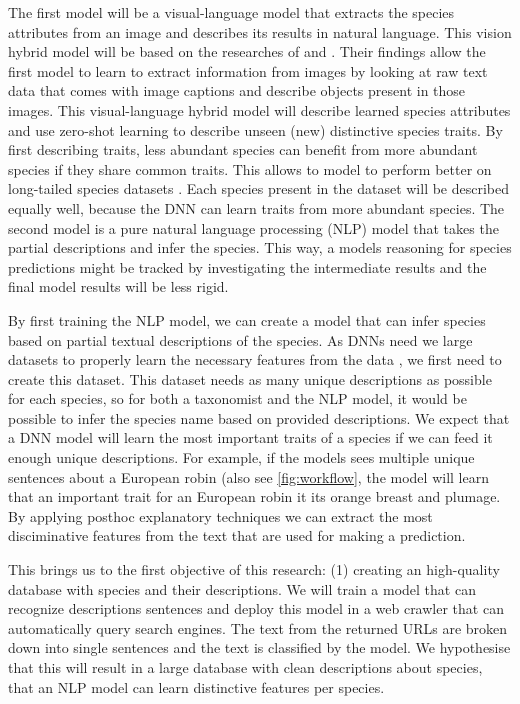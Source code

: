 \documentclass[a4paper, 12pt, oneside]{book} %
\begin{document}
The first model will be a visual-language model that extracts the species attributes from an image and describes its results in natural language. 
This vision hybrid model will be based on the researches of \textcite{radford_learning_2021} and \textcite{huang_interpretable_2020}.
Their findings allow the first model to learn to extract information from images by looking at raw text data that comes with image captions and describe objects present in those images.
This visual-language hybrid model will describe learned species attributes and use zero-shot learning to describe unseen (new) distinctive species traits.
By first describing traits, less abundant species can benefit from more abundant species if they share common traits.
This allows to model to perform better on long-tailed species datasets \autocite{van_horn_inaturalist_2018}.
Each species present in the dataset will be described equally well, because the DNN can learn traits from more abundant species.
The second model is a pure natural language processing (NLP) model that takes the partial descriptions and infer the species.
This way, a models reasoning for species predictions might be tracked by investigating the intermediate results \autocite{ishikawa_contextual_2021} and the final model results will be less rigid.

By first training the NLP model, we can create a model that can infer species based on partial textual descriptions of the species. 
As DNNs need we large datasets to properly learn the necessary features from the data \autocite{xue-wen_chen_big_2014, gheisari_survey_2017}, we first need to create this dataset.
This dataset needs as many unique descriptions as possible for each species, so for both a taxonomist and the NLP model, it would be possible to infer the species name based on provided descriptions.
We expect that a DNN model will learn the most important traits of a species if we can feed it enough unique descriptions.
For example, if the models sees multiple unique sentences about a European robin (also see \ref{fig:workflow}, the model will learn that an important trait for an European robin it its orange breast and plumage.
By applying posthoc explanatory techniques we can extract the most disciminative features from the text that are used for making a prediction.

This brings us to the first objective of this research: (1) creating an high-quality database with species and their descriptions.
We will train a model that can recognize descriptions sentences and deploy this model in a web crawler that can automatically query search engines.
The text from the returned URLs are broken down into single sentences and the text is classified by the model.
We hypothesise that this will result in a large database with clean descriptions about species, that an NLP model can learn distinctive features per species.
\end{document}
